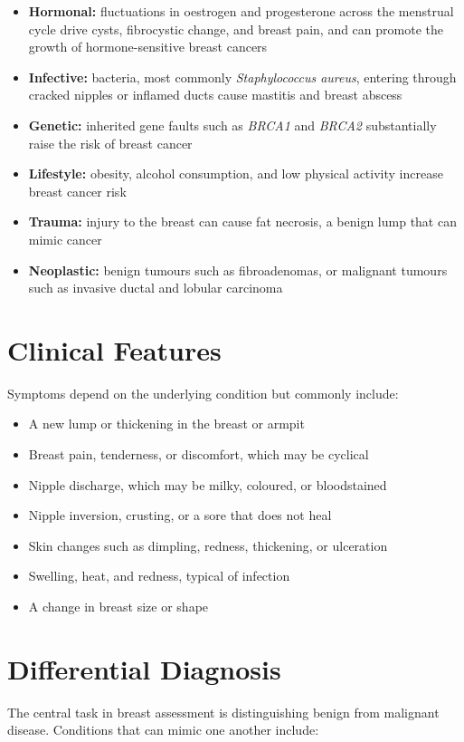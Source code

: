 \begin{itemize}
    \item \textbf{Hormonal:} fluctuations in oestrogen and progesterone across the menstrual cycle drive cysts, fibrocystic change, and breast pain, and can promote the growth of hormone-sensitive breast cancers
    \item \textbf{Infective:} bacteria, most commonly \textit{Staphylococcus aureus}, entering through cracked nipples or inflamed ducts cause mastitis and breast abscess
    \item \textbf{Genetic:} inherited gene faults such as \textit{BRCA1} and \textit{BRCA2} substantially raise the risk of breast cancer
    \item \textbf{Lifestyle:} obesity, alcohol consumption, and low physical activity increase breast cancer risk
    \item \textbf{Trauma:} injury to the breast can cause fat necrosis, a benign lump that can mimic cancer
    \item \textbf{Neoplastic:} benign tumours such as fibroadenomas, or malignant tumours such as invasive ductal and lobular carcinoma
\end{itemize}

\section*{Clinical Features}
Symptoms depend on the underlying condition but commonly include:

\begin{itemize}
    \item A new lump or thickening in the breast or armpit
    \item Breast pain, tenderness, or discomfort, which may be cyclical
    \item Nipple discharge, which may be milky, coloured, or bloodstained
    \item Nipple inversion, crusting, or a sore that does not heal
    \item Skin changes such as dimpling, redness, thickening, or ulceration
    \item Swelling, heat, and redness, typical of infection
    \item A change in breast size or shape
\end{itemize}

\section*{Differential Diagnosis}
The central task in breast assessment is distinguishing benign from malignant disease. Conditions that can mimic one another include:

